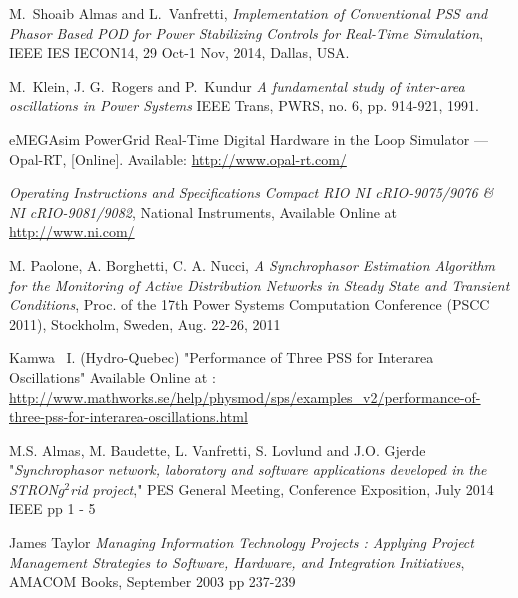 \documentclass[conference]{IEEEtran}
\begin{document}
\begin{thebibliography}{1}
 M.~Shoaib Almas and L.~Vanfretti, \emph{Implementation of Conventional PSS and Phasor Based POD for Power Stabilizing Controls for Real-Time Simulation}, IEEE IES IECON14, 29 Oct-1 Nov, 2014, Dallas, USA.

M.~Klein, J. G.~Rogers and P.~Kundur \emph{A fundamental study of inter-area oscillations in Power Systems} IEEE Trans, PWRS, no. 6, pp. 914-921, 1991.

 eMEGAsim PowerGrid Real-Time Digital Hardware in the Loop Simulator — Opal-RT, [Online]. Available: \url{http://www.opal-rt.com/}

 \emph{Operating Instructions and Specifications Compact RIO NI cRIO-9075/9076 \& NI cRIO-9081/9082}, National Instruments, Available Online at \url{http://www.ni.com/}

 M. Paolone, A. Borghetti, C. A. Nucci, \emph{A Synchrophasor Estimation Algorithm for the Monitoring of Active Distribution Networks in Steady State and Transient Conditions}, Proc. of the 17th Power Systems Computation Conference (PSCC 2011), Stockholm, Sweden, Aug. 22-26, 2011 

 Kamwa \ I. (Hydro-Quebec) "Performance of Three PSS for Interarea Oscillations" Available Online at : \url{http://www.mathworks.se/help/physmod/sps/examples_v2/performance-of-three-pss-for-interarea-oscillations.html}



 M.S. Almas, M. Baudette, L. Vanfretti, S. Lovlund and J.O. Gjerde "\emph{Synchrophasor network, laboratory and software applications developed in the STRON$g^{2}$rid project}," PES General Meeting, Conference Exposition, July 2014 IEEE pp 1 - 5

 James Taylor \emph{Managing Information Technology Projects : Applying Project Management Strategies to Software, Hardware, and Integration Initiatives}, AMACOM Books, September 2003 pp 237-239



\end{thebibliography}
\end{document}
